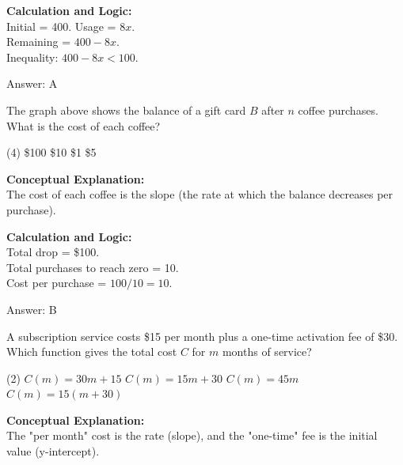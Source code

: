\documentclass[11pt,paper=a4,answers]{exam}
\begin{document}
\begin{questions}
\begin{solution}
\vspace{10pt}
\textbf{Calculation and Logic:} \\
Initial = 400. Usage = $8x$. \\
Remaining = $400 - 8x$. \\
Inequality: $400 - 8x < 100$.

\vspace{15pt}
Answer: \colorbox{yellow!100}{A}
\end{solution}

\vspace{20pt}

\question

The graph above shows the balance of a gift card $B$ after $n$ coffee purchases. What is the cost of each coffee?
\begin{tasks}(4)
    \task \$100
    \task \$10
    \task \$1
    \task \$5
\end{tasks}

\begin{solution}
\textbf{Conceptual Explanation:} \\
The cost of each coffee is the slope (the rate at which the balance decreases per purchase).

\vspace{10pt}
\textbf{Calculation and Logic:} \\
Total drop = \$100. \\
Total purchases to reach zero = 10. \\
Cost per purchase = $100 / 10 = 10$.

\vspace{15pt}
Answer: \colorbox{yellow!100}{B}
\end{solution}

\vspace{20pt}

\question
A subscription service costs \$15 per month plus a one-time activation fee of \$30. Which function gives the total cost $C$ for $m$ months of service?
\begin{tasks}(2)
    \task $C(m) = 30m + 15$
    \task $C(m) = 15m + 30$
    \task $C(m) = 45m$
    \task $C(m) = 15(m + 30)$
\end{tasks}

\begin{solution}
\textbf{Conceptual Explanation:} \\
The "per month" cost is the rate (slope), and the "one-time" fee is the initial value (y-intercept).


\end{solution}
\end{questions}
\end{document}

